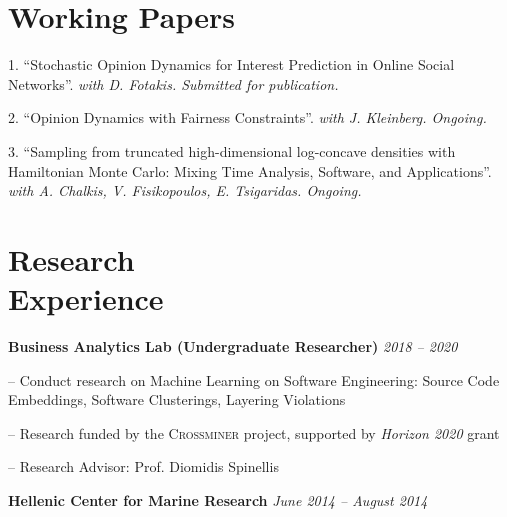 \documentclass[margin, 10pt]{res}
\begin{document}
\begin{resume}
\section{Working Papers}

\begin{compactitem}

\item[1.] ``Stochastic Opinion Dynamics for Interest Prediction in Online Social Networks''. \emph{with D. Fotakis. Submitted for publication.}
\item[2.] ``Opinion Dynamics with Fairness Constraints''. \emph{with J. Kleinberg. Ongoing.}
\item[3.] ``Sampling from truncated high-dimensional log-concave densities with Hamiltonian Monte Carlo: Mixing Time Analysis, Software, and Applications''. \emph{with A. Chalkis, V. Fisikopoulos, E. Tsigaridas. Ongoing.}

\end{compactitem}

\section{Research \\ Experience}

\textbf{Business Analytics Lab (Undergraduate Researcher)} \hfill \emph{2018 -- 2020}
\begin{compactitem}
\item[--] Conduct research on Machine Learning on Software Engineering: Source Code Embeddings, Software Clusterings, Layering Violations
\item[--] Research funded by the \textsc{Crossminer} project, supported by \emph{Horizon 2020} grant
\item[--] Research Advisor: Prof. Diomidis Spinellis
\end{compactitem}

\textbf{Hellenic Center for Marine Research} \hfill \emph{June 2014 -- August 2014}




\end{resume}
\end{document}
